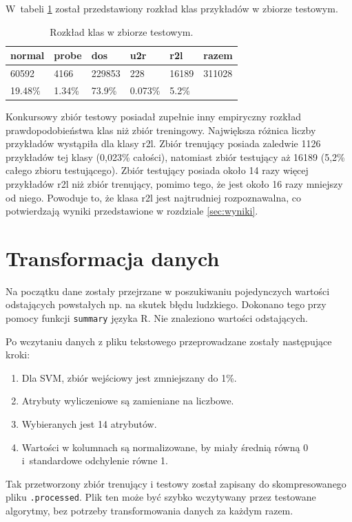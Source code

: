\documentclass[a4paper, 12pt]{article}
\begin{document}
W~tabeli \ref{table:test} został przedstawiony rozkład klas przykładów w zbiorze testowym.
\begin{table}[H]
\centering
	\begin{tabular}{ | l | l | l | l | l | l | } \hline
		normal & probe & dos & u2r & r2l & razem \\ \hline
		60592 & 4166 & 229853 & 228 & 16189 & 311028 \\ \hline
		19.48\% & 1.34\% & 73.9\% & 0.073\%  & 5.2\% & \\ \hline
	\end{tabular}
\caption{Rozkład klas w zbiorze testowym.}
\label{table:test}
\end{table}

Konkursowy zbiór testowy posiadał zupełnie inny empiryczny rozkład prawdopodobieństwa klas niż zbiór treningowy.
Największa różnica liczby przykładów wystąpiła dla klasy r2l. Zbiór trenujący posiada zaledwie
1126 przykładów tej klasy (0,023\% całości), natomiast zbiór testujący aż 16189 (5,2\% całego
zbioru testującego). Zbiór testujący posiada około 14 razy więcej przykładów r2l niż zbiór
trenujący, pomimo tego, że jest około 16 razy mniejszy od niego. Powoduje to, że klasa r2l
jest najtrudniej rozpoznawalna, co potwierdzają wyniki przedstawione w rozdziale \ref{sec:wyniki}.

\section{Transformacja danych}

Na początku dane zostały przejrzane w poszukiwaniu pojedynczych wartości odstających
powstałych np. na skutek błędu ludzkiego. Dokonano tego przy pomocy funkcji \texttt{summary}
języka R. Nie znaleziono wartości odstających.

Po wczytaniu danych z pliku tekstowego przeprowadzane zostały następujące kroki:
\begin{enumerate}
 \item Dla SVM, zbiór wejściowy jest zmniejszany do 1\%.
 \item Atrybuty wyliczeniowe są zamieniane na liczbowe.
 \item Wybieranych jest 14 atrybutów.
 \item Wartości w kolumnach są normalizowane, by miały średnią równą 0 i~standardowe odchylenie równe 1.
\end{enumerate}
Tak przetworzony zbiór trenujący i testowy został zapisany do skompresowanego pliku \texttt{.processed}.
Plik ten może być szybko wczytywany przez testowane algorytmy, bez potrzeby
transformowania danych za każdym razem.
\end{document}
